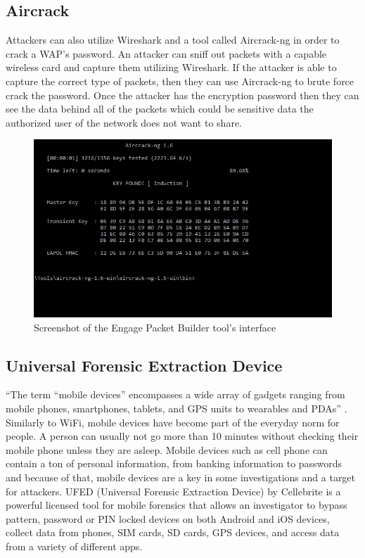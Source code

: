 \documentclass[acmlarge]{style/acmart}
\begin{document}
\subsection{Aircrack}

Attackers can also utilize Wireshark and a tool called Aircrack-ng in order to crack a WAP’s password. An attacker can sniff out packets with a capable wireless card and capture them utilizing Wireshark. If the attacker is able to capture the correct type of packets, then they can use Aircrack-ng to brute force crack the password. Once the attacker has the encryption password then they can see the data behind all of the packets which could be sensitive data the authorized user of the network does not want to share. 

\begin{figure}[H]
  \centering
  \includegraphics[width=0.5\linewidth]{imgs/aircrack.jpg}
  \caption{Screenshot of the Engage Packet Builder tool's interface}
  \label{fig:aircrack}
\end{figure}

\subsection{Universal Forensic Extraction Device}

“The term “mobile devices” encompasses a wide array of gadgets ranging from mobile phones, smartphones, tablets, and GPS units to wearables and PDAs” \cite{Kostadinov_2019}. Similarly to WiFi, mobile devices have become part of the everyday norm for people. A person can usually not go more than 10 minutes without checking their mobile phone unless they are asleep. Mobile devices such as cell phone can contain a ton of personal information, from banking information to passwords and because of that, mobile devices are a key in some investigations and a target for attackers. 
UFED (Universal Forensic Extraction Device) by Cellebrite is a powerful licensed tool for mobile forensics that allows an investigator to bypass pattern, password or PIN locked devices on both Android and iOS devices, collect data from phones, SIM cards, SD cards, GPS devices, and access data from a variety of different apps. 
\end{document}
